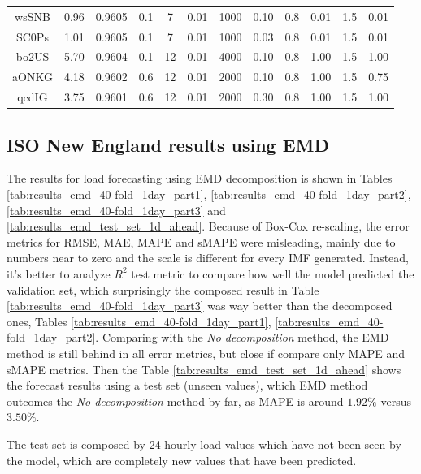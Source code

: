 \begin{table}[!htpb]
{\begin{tabular}{cccccccccccc}
wsSNB & 0.96 & 0.9605 & 0.1 & 7 & 0.01 & 1000 & 0.10 & 0.8 & 0.01 & 1.5 & 0.01 \\
SC0Ps & 1.01 & 0.9605 & 0.1 & 7 & 0.01 & 1000 & 0.03 & 0.8 & 0.01 & 1.5 & 0.01 \\
bo2US & 5.70 & 0.9604 & 0.1 & 12 & 0.01 & 4000 & 0.10 & 0.8 & 1.00 & 1.5 & 1.00 \\
aONKG & 4.18 & 0.9602 & 0.6 & 12 & 0.01 & 2000 & 0.10 & 0.8 & 1.00 & 1.5 & 0.75 \\
qcdIG & 3.75 & 0.9601 & 0.6 & 12 & 0.01 & 2000 & 0.30 & 0.8 & 1.00 & 1.5 & 1.00 \\ \hline
\end{tabular}%
}
\end{table}

\subsection{ISO New England results using EMD}
The results for load forecasting using EMD decomposition is shown in Tables \ref{tab:results_emd_40-fold_1day_part1}, \ref{tab:results_emd_40-fold_1day_part2}, \ref{tab:results_emd_40-fold_1day_part3} and \ref{tab:results_emd_test_set_1d_ahead}. Because of Box-Cox re-scaling, the error metrics for RMSE, MAE, MAPE and sMAPE were misleading, mainly due to numbers near to zero and the scale is different for every IMF generated. Instead, it's better to analyze $R^2$ test metric to compare how well the model predicted the validation set, which surprisingly the composed result in Table \ref{tab:results_emd_40-fold_1day_part3} was way better than the decomposed ones, Tables \ref{tab:results_emd_40-fold_1day_part1}, \ref{tab:results_emd_40-fold_1day_part2}. Comparing with the \textit{No decomposition} method, the EMD method is still behind in all error metrics, but close if compare only MAPE and sMAPE metrics. Then the Table \ref{tab:results_emd_test_set_1d_ahead} shows the forecast results using a test set (unseen values), which EMD method outcomes the \textit{No decomposition} method by far, as MAPE is around $1.92\%$ versus $3.50\%$.

The test set is composed by 24 hourly load values which have not been seen by the model, which are completely new values that have been predicted. 

